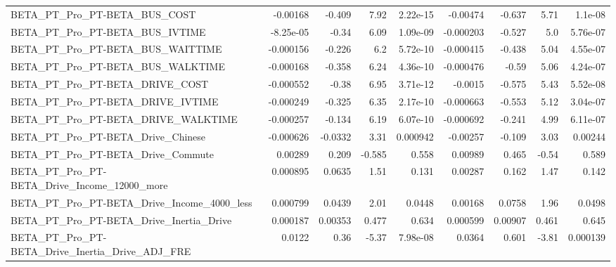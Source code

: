 \begin{tabular}{lrrrrrrrr}
BETA\_PT\_Pro\_PT-BETA\_BUS\_COST                       &    -0.00168 &       -0.409 &     7.92 & 2.22e-15 &   -0.00474 &      -0.637 &         5.71 &       1.1e-08 \\
BETA\_PT\_Pro\_PT-BETA\_BUS\_IVTIME                     &   -8.25e-05 &        -0.34 &     6.09 & 1.09e-09 &  -0.000203 &      -0.527 &          5.0 &      5.76e-07 \\
BETA\_PT\_Pro\_PT-BETA\_BUS\_WAITTIME                   &   -0.000156 &       -0.226 &      6.2 & 5.72e-10 &  -0.000415 &      -0.438 &         5.04 &      4.55e-07 \\
BETA\_PT\_Pro\_PT-BETA\_BUS\_WALKTIME                   &   -0.000168 &       -0.358 &     6.24 & 4.36e-10 &  -0.000476 &       -0.59 &         5.06 &      4.24e-07 \\
BETA\_PT\_Pro\_PT-BETA\_DRIVE\_COST                     &   -0.000552 &        -0.38 &     6.95 & 3.71e-12 &    -0.0015 &      -0.575 &         5.43 &      5.52e-08 \\
BETA\_PT\_Pro\_PT-BETA\_DRIVE\_IVTIME                   &   -0.000249 &       -0.325 &     6.35 & 2.17e-10 &  -0.000663 &      -0.553 &         5.12 &      3.04e-07 \\
BETA\_PT\_Pro\_PT-BETA\_DRIVE\_WALKTIME                 &   -0.000257 &       -0.134 &     6.19 & 6.07e-10 &  -0.000692 &      -0.241 &         4.99 &      6.11e-07 \\
BETA\_PT\_Pro\_PT-BETA\_Drive\_Chinese                  &   -0.000626 &      -0.0332 &     3.31 & 0.000942 &   -0.00257 &      -0.109 &         3.03 &       0.00244 \\
BETA\_PT\_Pro\_PT-BETA\_Drive\_Commute                  &     0.00289 &        0.209 &   -0.585 &    0.558 &    0.00989 &       0.465 &        -0.54 &         0.589 \\
BETA\_PT\_Pro\_PT-BETA\_Drive\_Income\_12000\_more        &    0.000895 &       0.0635 &     1.51 &    0.131 &    0.00287 &       0.162 &         1.47 &         0.142 \\
BETA\_PT\_Pro\_PT-BETA\_Drive\_Income\_4000\_less         &    0.000799 &       0.0439 &     2.01 &   0.0448 &    0.00168 &      0.0758 &         1.96 &        0.0498 \\
BETA\_PT\_Pro\_PT-BETA\_Drive\_Inertia\_Drive            &    0.000187 &      0.00353 &    0.477 &    0.634 &   0.000599 &     0.00907 &        0.461 &         0.645 \\
BETA\_PT\_Pro\_PT-BETA\_Drive\_Inertia\_Drive\_ADJ\_FRE    &      0.0122 &         0.36 &    -5.37 & 7.98e-08 &     0.0364 &       0.601 &        -3.81 &      0.000139 \\

\end{tabular}
